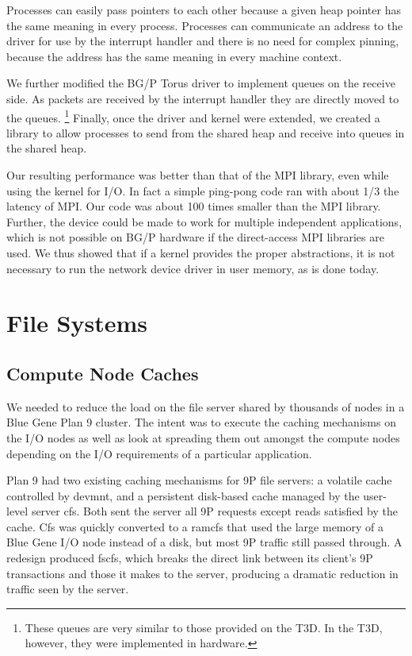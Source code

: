 Processes can easily pass pointers to each other because 
a given heap pointer has the same meaning in every process. Processes can communicate an address 
to the driver for use by the interrupt handler and there is no need for complex pinning, because the 
address has the same meaning in every machine context. 

We further modified the BG/P Torus driver to implement queues on the receive side. As packets are 
received  by the interrupt handler they are directly moved to the queues. 
\footnote{These queues are 
very similar to those provided on the T3D. In the T3D, however, they were implemented in hardware. }
Finally, once the driver and kernel were extended, we created a library to allow processes to 
send from the shared heap and receive into queues in the shared heap. 

Our resulting performance was better than that of the MPI library, even while using 
the kernel for I/O. In fact a simple ping-pong code ran with about 1/3 the latency 
of MPI. Our code was about 100 times smaller than the MPI library. Further, 
the device could be made to work for multiple independent applications, which is not possible
on BG/P hardware if the direct-access MPI libraries are used. We thus showed that if a 
kernel provides the proper abstractions, it is not necessary to run the network device driver
in user memory, as is done today. 

\section{File Systems}
\subsection{Compute Node Caches}

We needed to reduce the load on the file server shared by thousands of
nodes in a Blue Gene Plan 9 cluster. The intent was to execute the caching
mechanisms on the I/O nodes as well as look at spreading them out amongst 
the compute nodes depending on the I/O requirements of a particular 
application.  

Plan 9 had two existing caching mechanisms for 9P file servers: a volatile 
cache controlled by devmnt, and a persistent disk-based cache managed by 
the user-level server cfs.
Both sent the server all 9P requests except reads satisfied by the cache.
Cfs was quickly converted to a ramcfs that used the large memory of a
Blue Gene I/O node instead of a disk, but most 9P traffic still passed
through. A redesign produced fscfs, which breaks the direct link
between its client's 9P transactions and those it makes to the server,
producing a dramatic reduction in traffic seen by the server.

